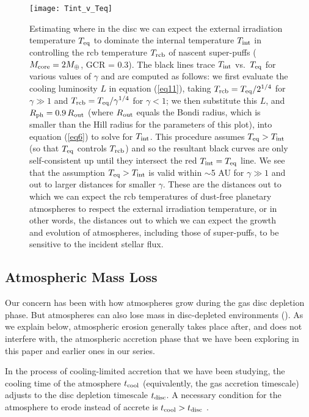 \documentclass[fleqn,useAMS,usenatbib]{mnras}
\begin{document}
\begin{figure}
    \centering
    \texttt{[image: Tint\_v\_Teq]}
    \caption{Estimating where in the disc we can expect
    the external irradiation temperature $T_{\rm eq}$ 
    to dominate the internal temperature $T_{\rm int}$
    in controlling the rcb temperature $T_{\rm rcb}$
    of nascent super-puffs ($M_{\rm core} = 2 M_{\oplus}$, GCR = 0.3).
    The black lines trace $T_{\rm int}$ vs.~$T_{\rm eq}$ for various
    values of $\gamma$ and are computed as follows: we first evaluate
    the cooling luminosity $L$ in equation (\ref{eq11}), taking
    $T_{\rm rcb} = T_{\rm eq}/2^{1/4}$ for $\gamma \gg 1$
    and $T_{\rm rcb} = T_{\rm eq} / \gamma^{1/4}$ for $\gamma < 1$;
    we then substitute this $L$,
    and $R_{\rm ph} = 0.9\,R_{\rm out}$ (where $R_{\rm out}$ equals
    the Bondi radius, which is smaller than the Hill radius for the parameters
    of this plot), into equation (\ref{eq6}) to solve
    for $T_{\rm int}$. This procedure assumes $T_{\rm eq} > T_{\rm int}$
    (so that $T_{\rm eq}$ controls $T_{\rm rcb}$) 
    and so the resultant black curves are only self-consistent up until
    they intersect the red $T_{\rm int} = T_{\rm eq}$ line.
    We see that the assumption $T_{\rm eq} > T_{\rm int}$ is valid within
    $\sim$5 AU for $\gamma \gg 1$ and out to larger distances for smaller
    $\gamma$. These are the distances out to which we can expect
    the rcb temperatures of dust-free planetary atmospheres to respect the
    external irradiation temperature, or in other words, the distances out
    to which we can expect the growth and evolution of atmospheres,
    including those of super-puffs, to be sensitive to the
    incident stellar flux.}
    \label{fig7}
\end{figure}

\subsection{Atmospheric Mass Loss}
\label{ssec:accr_depl}

Our concern has been with how atmospheres grow during the gas disc
depletion phase. But atmospheres can also lose mass in
disc-depleted environments (\citealt{ikoma12, owen13, owen16, owen17,
  ginzburg16, ginzburg17}).  As we explain below, atmospheric erosion
generally takes place after, and does not interfere with, the 
atmospheric accretion phase that we have been exploring in this paper and earlier ones in our series.
 
In the process of cooling-limited accretion that we have been studying,
the cooling time of the atmosphere $t_{\rm cool}$ 
(equivalently, the gas accretion timescale)
adjusts to
the disc depletion timescale $t_{\rm disc}$. 
A necessary condition for the atmosphere to
erode instead of accrete is
$t_{\rm cool} > t_{\rm disc}$ \citep{ikoma12,owen16}.
\end{document}
